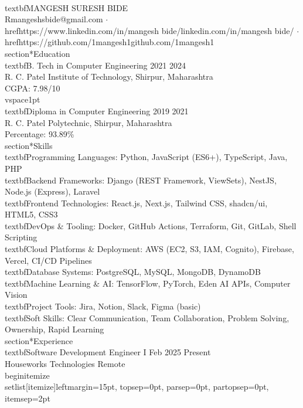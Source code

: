 \documentclass[10pt]{article}
\begin{document}
{\LARGE \\textbf{MANGESH SURESH BIDE}} \\
Rmangeshsbide@gmail.com $\cdot$ \\href{https://www.linkedin.com/in/mangesh\textendash{} bide/}{linkedin.com/in/mangesh\textendash{} bide/} $\cdot$ \\href{https://github.com/1mangesh1}{github.com/1mangesh1} \\section*{\Large Education}
\\textbf{B. Tech in Computer Engineering} \hfill 2021	\textendash{} 2024 \\
R. C. Patel Institute of Technology, Shirpur, Maharashtra \\
CGPA: 7.98/10 \\vspace{1pt}
\\textbf{Diploma in Computer Engineering} \hfill 2019	\textendash{} 2021 \\
R. C. Patel Polytechnic, Shirpur, Maharashtra \\
Percentage: 93.89\% \\section*{\Large Skills}
\\textbf{Programming Languages:} Python, JavaScript (ES6+), TypeScript, Java, PHP \\textbf{Backend Frameworks:} Django (REST Framework, ViewSets), NestJS, Node.js (Express), Laravel \\textbf{Frontend Technologies:} React.js, Next.js, Tailwind CSS, shadcn/ui, HTML5, CSS3 \\textbf{DevOps \& Tooling:} Docker, GitHub Actions, Terraform, Git, GitLab, Shell Scripting \\textbf{Cloud Platforms \& Deployment:} AWS (EC2, S3, IAM, Cognito), Firebase, Vercel, CI/CD Pipelines \\textbf{Database Systems:} PostgreSQL, MySQL, MongoDB, DynamoDB \\textbf{Machine Learning \& AI:} TensorFlow, PyTorch, Eden AI APIs, Computer Vision \\textbf{Project Tools:} Jira, Notion, Slack, Figma (basic) \\textbf{Soft Skills:} Clear Communication, Team Collaboration, Problem\textendash{} Solving, Ownership, Rapid Learning \\section*{\Large Experience}
\\textbf{Software Development Engineer\textendash{} I} \hfill Feb 2025	\textendash{} Present \\
Houseworks Technologies 	\textendash{} Remote \\begin{itemize}\\setlist[itemize]{leftmargin=15pt, topsep=0pt, parsep=0pt, partopsep=0pt, itemsep=2pt}
\end{document}
